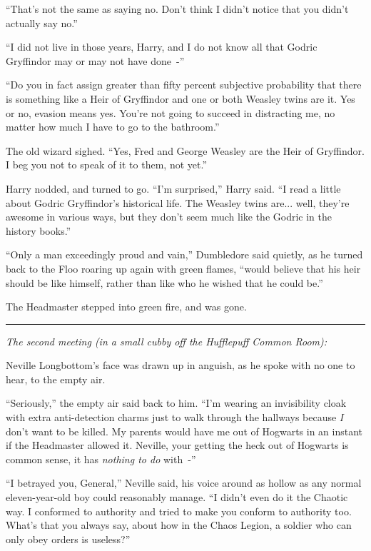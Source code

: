``That's not the same as saying no. Don't think I didn't notice that you didn't actually say no.''

``I did not live in those years, Harry, and I do not know all that Godric Gryffindor may or may not have done~-''

``Do you in fact assign greater than fifty percent subjective probability that there is something like a Heir of Gryffindor and one or both Weasley twins are it. Yes or no, evasion means yes. You're not going to succeed in distracting me, no matter how much I have to go to the bathroom.''

The old wizard sighed. ``Yes, Fred and George Weasley are the Heir of Gryffindor. I beg you not to speak of it to them, not yet.''

Harry nodded, and turned to go. ``I'm surprised,'' Harry said. ``I read a little about Godric Gryffindor's historical life. The Weasley twins are... well, they're awesome in various ways, but they don't seem much like the Godric in the history books.''

``Only a man exceedingly proud and vain,'' Dumbledore said quietly, as he turned back to the Floo roaring up again with green flames, ``would believe that his heir should be like himself, rather than like who he wished that he could be.''

The Headmaster stepped into green fire, and was gone.

\begin{center}\rule{3in}{0.4pt}\end{center}

\emph{The second meeting (in a small cubby off the Hufflepuff Common Room):}

Neville Longbottom's face was drawn up in anguish, as he spoke with no one to hear, to the empty air.

``Seriously,'' the empty air said back to him. ``I'm wearing an invisibility cloak with extra anti-detection charms just to walk through the hallways because \emph{I} don't want to be killed. My parents would have me out of Hogwarts in an instant if the Headmaster allowed it. Neville, your getting the heck out of Hogwarts is common sense, it has \emph{nothing to do} with~-''

``I betrayed you, General,'' Neville said, his voice around as hollow as any normal eleven-year-old boy could reasonably manage. ``I didn't even do it the Chaotic way. I conformed to authority and tried to make you conform to authority too. What's that you always say, about how in the Chaos Legion, a soldier who can only obey orders is useless?''

